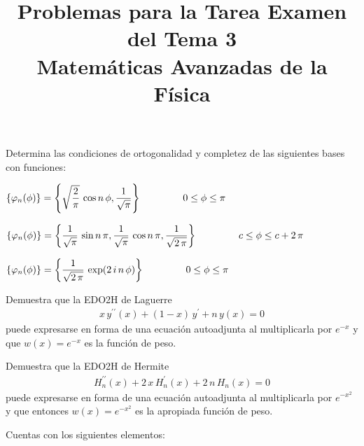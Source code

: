 
\title{Problemas para  la Tarea Examen del Tema 3 \\ \large{Matemáticas Avanzadas de la Física}\vspace{-8ex}}
\date{ }

\vspace{-4cm}
\renewcommand\labelenumii{\theenumi.{\arabic{enumii}}}
\maketitle
\fontsize{14}{14}\selectfont
\begin{milista}
\item Determina las condiciones de ortogonalidad y completez de las siguientes bases con funciones:
\begin{milista}
\item $\left\{ \varphi_{n} (\phi) \right\} = \left\{ \sqrt{\dfrac{2}{\pi}} \, \cos n \,\phi, \dfrac{1}{\sqrt{\pi}} \right\} \hspace{1.5cm} 0 \leq \phi \leq \pi$
\item $\left\{ \varphi_{n} (\phi) \right\} = \left\{ \dfrac{1}{\sqrt{\pi}} \, \sin n \, \pi,  \dfrac{1}{\sqrt{\pi}} \, \cos n \, \pi , \dfrac{1}{\sqrt{2 \, \pi}} \right\} \hspace{1.5cm} c \leq \phi \leq c + 2 \, \pi$
\item $\left\{ \varphi_{n} (\phi) \right\} = \left\{ \dfrac{1}{\sqrt{2 \, \pi}} \, \exp(2 \, i \, n \, \phi)  \right\} \hspace{1.5cm} 0 \leq \phi \leq \pi$
\end{milista}
\item Demuestra que la EDO2H de Laguerre
\begin{align*}
x \, y^{\prime \prime}(x) + (1- x) \, y^{\prime} + n \, y (x) = 0
\end{align*}
puede expresarse en forma de una ecuación autoadjunta al multiplicarla por $e^{-x}$ y que $w(x) = e^{-x}$ es la función de peso.
\item Demuestra que la EDO2H de Hermite
\begin{align*}
H_{n}^{\prime \prime} (x) + 2 \, x \, H_{n}^{\prime} (x) + 2 \, n \, H_{n} (x) = 0
\end{align*}
puede expresarse en forma de una ecuación autoadjunta al multiplicarla por $e^{-x^{2}}$ y que entonces $w(x) = e^{-x^{2}}$ es la apropiada función de peso.
\item Cuentas con los siguientes elementos:
\begin{milista}

\end{milista}
\end{milista}
